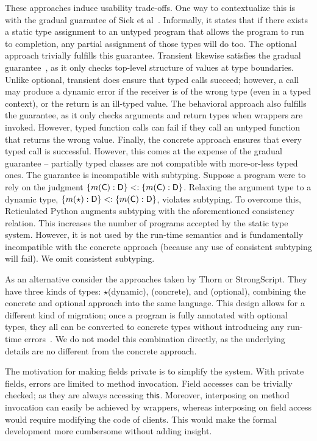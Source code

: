 \documentclass[a4paper,USenglish]{lipics-v2018}
\newcommand{\EM}[1]{\ensuremath{#1}\xspace}
\newcommand{\xt}[1]{{\sf{#1}}}
\newcommand{\EMxt}[1]{\EM{\xt{#1}}}
\newcommand{\any}{\EM{\star}}
\newcommand{\this}{\EMxt{this}}
\begin{document}
These approaches induce usability trade-offs. One way to contextualize this
is with the gradual guarantee of Siek et
al~\cite{GradualGuarantee}. Informally, it states that if there exists a
static type assignment to an untyped program that allows the program to run
to completion, any partial assignment of those types will do too. The
optional approach trivially fulfills this guarantee. Transient likewise
satisfies the gradual guarantee~\cite{Vitousek2017}, as it only checks
top-level structure of values at type boundaries. Unlike optional, transient
does ensure that typed calls succeed; however, a call may produce a dynamic
error if the receiver is of the wrong type (even in a typed context), or the
return is an ill-typed value. The behavioral approach also fulfills the
guarantee, as it only checks arguments and return types when wrappers are
invoked. However, typed function calls can fail if they call an untyped
function that returns the wrong value. Finally, the concrete approach
ensures that every typed call is successful. However, this comes at the
expense of the gradual guarantee -- partially typed classes are not
compatible with more-or-less typed ones. The guarantee
is incompatible with subtyping. Suppose a program were to rely on the
judgment $\{m(\C):\D\} <: \{m(\C):\D\}$. Relaxing the argument type to a
dynamic type, $\{m(\any):\D\} <: \{m(\C):\D\}$, violates subtyping. To
overcome this, Reticulated Python augments subtyping with the aforementioned
consistency relation. This increases the number of programs accepted by the
static type system. However, it is not used by the run-time semantics and
is fundamentally incompatible with the concrete approach (because any use of
consistent subtyping will fail). We omit consistent subtyping.

As an alternative consider the approaches taken by Thorn or
StrongScript. They have three kinds of types: \any (dynamic), \C (concrete),
and \xt{like} \C (optional), combining the concrete and optional approach
into the same language. This design allows for a different kind of
migration; once a program is fully annotated with optional types, they all
can be converted to concrete types without introducing any run-time
errors~\cite{ecoop15}. We do not model this combination directly, as the
underlying details are no different from the concrete approach.

The motivation for making fields private is to simplify the system. With
private fields, errors are limited to method invocation. Field accesses can
be trivially checked; as they are always accessing \this. Moreover, interposing on
method invocation can easily be achieved by wrappers, whereas interposing
on field access would require modifying the code of clients. This would make
the formal development more cumbersome without adding insight.
\end{document}
